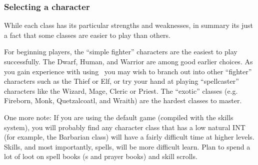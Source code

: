 \subsubsection{Selecting a character}

While each class has its particular strengths and weaknesses, in summary
its just a fact that some classes are easier to play than others.

For beginning players, the ``simple fighter'' characters are the easiest to
play successfully. The Dwarf, Human, and Warrior are among good earlier 
choices. As you gain experience
with using \cf\ you may wish to branch out into other ``fighter'' characters
such as the Thief or Elf, or try your hand at playing ``spellcaster'' 
characters like the Wizard, Mage, Cleric or Priest. 
The ``exotic'' classes (e.g. Fireborn, Monk, Quetzalcoatl, and Wraith) are 
the hardest classes to master. 

One more note: If you are using the default game (compiled with the skills 
system), 
you will probably find any character class that has a low natural INT (for 
example, the Barbarian class) will have a fairly difficult time at higher 
levels. Skills, and most importantly, spells, will be more difficult
learn. Plan to spend a lot of loot on spell books (\wizbook s and prayer books)
and skill scrolls.
